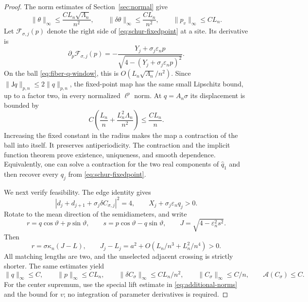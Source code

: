 \documentclass[11pt,reqno]{amsart}
\numberwithin{equation}{section}
\theoremstyle{definition}
\theoremstyle{remark}
\newcommand{\A}{\mathcal A}
\newcommand{\norm}[1]{\lVert #1\rVert}
\newcommand{\dd}{\delta}
\begin{document}
\begin{proof}
The norm estimates of Section~\ref{sec:normal} give
\begin{equation}\label{eq:fiber-basebounds}
 \norm\theta_\infty\le\frac{CL_n\sqrt{\Lambda_n}}{n^2},\qquad
 \norm{\dd\theta}_\infty\le\frac{CL_n}{n^2},\qquad
 \norm{p_v}_\infty\le CL_n.
\end{equation}
Let $\mathcal F_{\sigma,j}(p)$ denote the right side of \eqref{eq:schur-fixedpoint} at a site. Its derivative is
\begin{equation}\label{eq:fiber-contraction-derivative}
 \partial_p\mathcal F_{\sigma,j}(p)
 =-\frac{Y_j+\sigma_j\varepsilon_np}
        {\sqrt{4-(Y_j+\sigma_j\varepsilon_np)^2}}.
\end{equation}
On the ball \eqref{eq:fiber-q-window}, this is $O(L_n\sqrt{\Lambda_n}/n^2)$. Since $\norm{\mathsf Jq}_{p,n}\le2\norm q_{p,n}$, the fixed-point map has the same small Lipschitz bound, up to a factor two, in every normalized $\ell^p$ norm. At $q=A_n\sigma$ its displacement is bounded by
\[
 C\left(\frac{L_n}{n}+\frac{L_n^2\Lambda_n}{n^2}\right)
 \le\frac{CL_n}{n}.
\]
Increasing the fixed constant in the radius makes the map a contraction of the ball into itself. It preserves antiperiodicity. The contraction and the implicit function theorem prove existence, uniqueness, and smooth dependence. Equivalently, one can solve a contraction for the two real components of $\widehat q_1$ and then recover every $q_j$ from \eqref{eq:schur-fixedpoint}.

We next verify feasibility. The edge identity gives
\[
 |d_j+d_{j+1}+\sigma_j\dd C_{\sigma,j}|^2=4,
 \qquad X_j+\sigma_j\varepsilon_nq_j>0.
\]
Rotate to the mean direction of the semidiameters, and write
\begin{equation}\label{eq:fiber-rotated-fields}
 r=q\cos\vartheta+p\sin\vartheta,\qquad
 s=p\cos\vartheta-q\sin\vartheta,\qquad
 J=\sqrt{4-\varepsilon_n^2s^2}.
\end{equation}
Then
\begin{equation}\label{eq:fiber-width}
 r=\sigma\kappa_n(J-L),\qquad
 J_j-L_j=a^2+O(L_n/n^3+L_n^2/n^4)>0.
\end{equation}
All matching lengths are two, and the unselected adjacent crossing is strictly shorter. The same estimates yield
\begin{equation}\label{eq:fiber-pointwise}
 \norm q_\infty\le C,\qquad \norm p_\infty\le CL_n,\qquad
 \norm{\dd C_\sigma}_\infty\le CL_n/n^2,\qquad
 \norm{C_\sigma}_\infty\le C/n,\qquad \A(C_\sigma)\le C.
\end{equation}
For the center supremum, use the special lift estimate in \eqref{eq:additional-norms} and the bound for $v$; no integration of parameter derivatives is required.


\end{proof}
\end{document}
